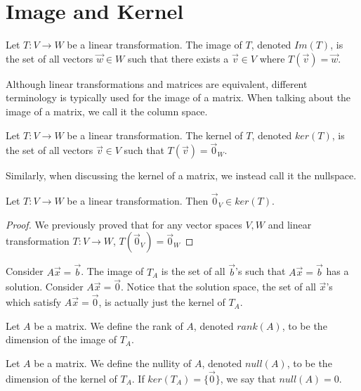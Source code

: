 \section{Image and Kernel}
\begin{definition}
    Let $T:V\to W$ be a linear transformation. The image of $T$, denoted $Im(T)$, is the set of all vectors $\vec{w}\in W$ such that there exists a $\vec{v}\in V$ where $T(\vec{v})=\vec{w}$.
\end{definition}
\begin{remark}
    Although linear transformations and matrices are equivalent, different terminology is typically used for the image of a matrix. When talking about the image of a matrix, we call it the column space.
\end{remark}
\begin{definition}
    Let $T:V\to W$ be a linear transformation. The kernel of $T$, denoted $ker(T)$, is the set of all vectors $\vec{v}\in V$ such that $T(\vec{v})=\vec{0}_W$.
\end{definition}
\begin{remark}
    Similarly, when discussing the kernel of a matrix, we instead call it the nullspace.
\end{remark}
\begin{theorem}
    Let $T:V\to W$ be a linear transformation. Then $\vec{0}_V\in ker(T)$.
\end{theorem}
\begin{proof}
    We previously proved that for any vector spaces $V, W$ and linear transformation $T:V\to W$, $T(\vec{0}_V)=\vec{0}_W$
\end{proof}
Consider $A\vec{x}=\vec{b}$. The image of $T_A$ is the set of all $\vec{b}$'s such that $A\vec{x}=\vec{b}$ has a solution. Consider $A\vec{x}=\vec{0}$. Notice that the solution space, the set of all $\vec{x}$'s which satisfy $A\vec{x}=\vec{0}$, is actually just the kernel of $T_A$.
\begin{definition}
    Let $A$ be a matrix. We define the rank of $A$, denoted $rank(A)$, to be the dimension of the image of $T_A$.
\end{definition}
\begin{definition}
    Let $A$ be a matrix. We define the nullity of $A$, denoted $null(A)$, to be the dimension of the kernel of $T_A$. If $ker(T_A)=\{\vec{0}\}$, we say that $null(A)=0$.
\end{definition}
